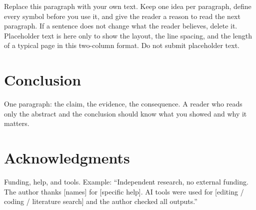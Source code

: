 \documentclass[9pt,a4paper,twocolumn]{article}
\begin{document}
Replace this paragraph with your own text. Keep one idea per paragraph, define every symbol before you use it, and give the reader a reason to read the next paragraph. If a sentence does not change what the reader believes, delete it. Placeholder text is here only to show the layout, the line spacing, and the length of a typical page in this two-column format. Do not submit placeholder text.



\section{Conclusion}
One paragraph: the claim, the evidence, the consequence. A reader who reads only the abstract and the conclusion should know what you showed and why it matters.

\section*{Acknowledgments}
Funding, help, and tools. Example: ``Independent research, no external funding. The author thanks [names] for [specific help]. AI tools were used for [editing / coding / literature search] and the author checked all outputs.''
\end{document}
